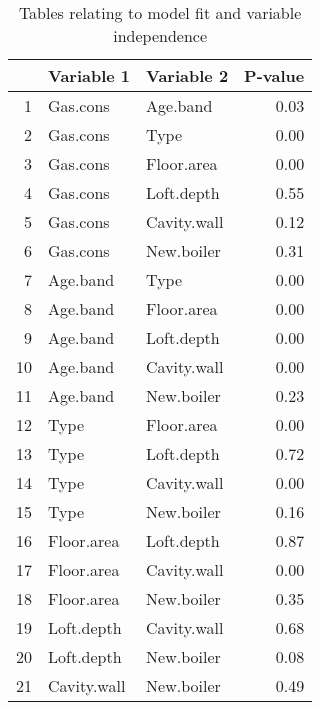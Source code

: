 \documentclass[]{extarticle}
\begin{document}
{ 
\begin{table}[H]
	\caption{Tables relating to model fit and variable independence}
	\begin{subtable}{0.45\linewidth}
		\footnotesize
		\centering
		\begin{tabular}{r|llr}
			\hline
			& Variable 1 & Variable 2 & P-value \\ 
			\hline
			1 & Gas.cons & Age.band & 0.03 \\ 
			2 & Gas.cons & Type & 0.00 \\ 
			3 & Gas.cons & Floor.area & 0.00 \\ 
			4 & Gas.cons & Loft.depth & 0.55 \\ 
			5 & Gas.cons & Cavity.wall & 0.12 \\ 
			6 & Gas.cons & New.boiler & 0.31 \\ 
			7 & Age.band & Type & 0.00 \\ 
			8 & Age.band & Floor.area & 0.00 \\ 
			9 & Age.band & Loft.depth & 0.00 \\ 
			10 & Age.band & Cavity.wall & 0.00 \\ 
			11 & Age.band & New.boiler & 0.23 \\ 
			12 & Type & Floor.area & 0.00 \\ 
			13 & Type & Loft.depth & 0.72 \\ 
			14 & Type & Cavity.wall & 0.00 \\ 
			15 & Type & New.boiler & 0.16 \\ 
			16 & Floor.area & Loft.depth & 0.87 \\ 
			17 & Floor.area & Cavity.wall & 0.00 \\ 
			18 & Floor.area & New.boiler & 0.35 \\ 
			19 & Loft.depth & Cavity.wall & 0.68 \\ 
			20 & Loft.depth & New.boiler & 0.08 \\ 
			21 & Cavity.wall & New.boiler & 0.49 \\ 
			\hline
		\end{tabular}
	
		\vspace{0.5em}
		

\end{subtable}
\end{table}}
\end{document}
